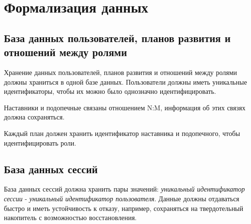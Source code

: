 %
%

%

\section{Формализация данных}

\subsection{База данных пользователей, планов развития и отношений между ролями}

Хранение данных пользователей, планов развития и отношений между ролями должны храниться в одной базе данных.
Пользователи должны иметь уникальные идентификаторы, чтобы их можно было однозначно идентифицировать.

Наставники и подопечные связаны отношением N:M, информация об этих связях должна сохраняться.

Каждый план должен хранить идентификатор наставника и подопечного, чтобы идентифицировать роли.

\subsection{База данных сессий}

База данных сессий должна хранить пары значений: \textit{уникальный идентификатор сессии} - \textit{уникальный идентификатор пользователя}.
Данные должны отдаваться быстро и иметь устойчивость к отказу, например, сохраняться на твердотельный накопитель с возможностью восстановления.

